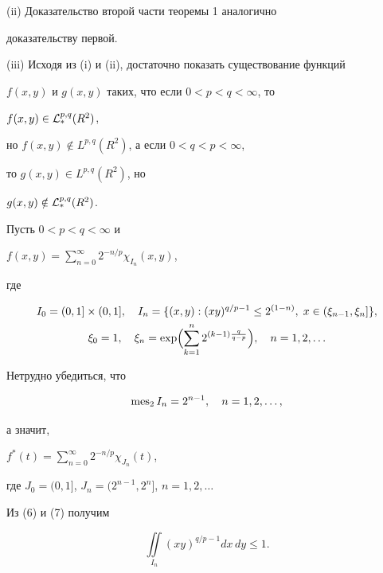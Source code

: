 (ii) Доказательство второй части теоремы 1 аналогично


доказательству первой.





(iii) Исходя из (i) и (ii), достаточно показать существование функций


$f(x,y)$ и $g(x,y)$ таких, что если $0<p<q<\infty$, то


$f(x,y) \in {\cal L}_{\ast}^{p,q}(R^2)$,


но $f(x,y) \notin L^{p,q}(R^2)$, а если $0<q<p<\infty$,


то $g(x,y) \in L^{p,q}(R^2)$, но


$g(x,y) \notin {\cal L}_*^{p,q}(R^2)$.





Пусть $0<p<q<\infty$ и


$f(x,y)=\sum\limits_{n=0}^{\infty} 2^{-n/p} \chi_{I_n}(x,y)$,


где


\begin{gather}


I_0 = (0,1] \times (0,1], \quad


I_n = \{(x,y): (xy)^{q/p-1} \le 2^{(1-n)}, \;


x \in (\xi_{n-1},\xi_n]\},\\


\xi_0=1,\quad \xi_n =


\exp \Bigl(\sum\limits_{k=1}^n 2^{(k-1)\frac{q}{q-p}} \Bigr),\quad


n=1,2,\dotsc\notag


\end{gather}


Нетрудно убедиться, что


\begin{equation}


\mes_2 I_n = 2^{n-1}, \quad n=1,2,\dotsc,


\end{equation}


а значит,


$f^*(t)=\sum\limits_{n=0}^{\infty} 2^{-n/p} \chi_{J_n}(t)$,


где $J_0=(0,1]$, $J_n=(2^{n-1},2^n]$, $n=1,2,\dotsc$


Из (6) и (7) получим


\begin{equation}


\iint\limits_{I_n}


(xy)^{q/p-1}dx\,dy \le 1.


\end{equation}





